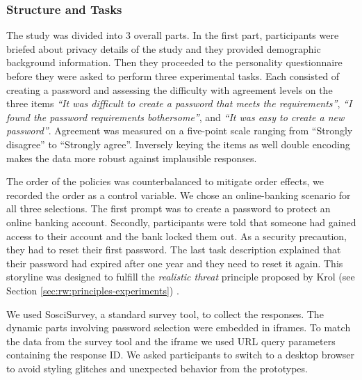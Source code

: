 \subsubsection{Structure and Tasks}
The study was divided into 3 overall parts. In the first part, participants were briefed about privacy details of the study and they provided demographic background information. Then they proceeded to the personality questionnaire before they were asked to perform three experimental tasks. Each consisted of creating a password and assessing the difficulty with agreement levels on the three items \textit{``It was difficult to create a password that meets the requirements''}, \textit{``I found the password requirements bothersome''}, and \textit{``It was easy to create a \textit{new} password''}. Agreement was measured on a five-point scale ranging from ``Strongly disagree'' to ``Strongly agree''. Inversely keying the items as well double encoding makes the data more robust against implausible responses. 

The order of the policies was counterbalanced to mitigate order effects, we recorded the order as a control variable. We chose an online-banking scenario for all three selections. The first prompt was to create a password to protect an online banking account. Secondly, participants were told that someone had gained access to their account and the bank locked them out. As a security precaution, they had to reset their first password. The last task description explained that their password had expired after one year and they need to reset it again. This storyline was designed to fulfill the \textit{realistic threat} principle proposed by Krol \etal (see Section \ref{sec:rw:principles-experiments}) \cite{Krol2016ExperimentDesign}. 

We used SosciSurvey, a standard survey tool, to collect the responses. The dynamic parts involving password selection were embedded in iframes. To match the data from the survey tool and the iframe we used URL query parameters containing the response ID. We asked participants to switch to a desktop browser to avoid styling glitches and unexpected behavior from the prototypes. %


